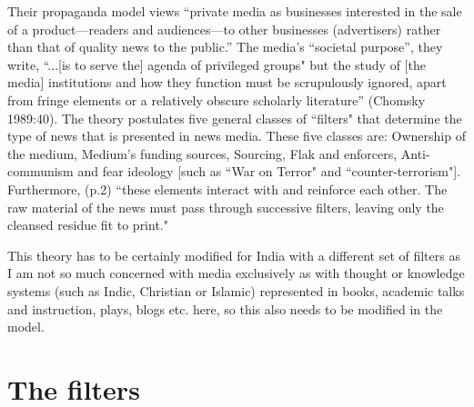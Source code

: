 Their propaganda model views “private media as businesses interested in the sale of a product—readers and audiences—to other businesses (advertisers) rather than that of quality news to the public.” The media's “societal purpose”, they write, “...[is to serve the] agenda of privileged groups" but the study of [the media] institutions and how they function must be scrupulously ignored, apart from fringe elements or a relatively obscure scholarly literature” (Chomsky 1989:40). The theory postulates five general classes of ``filters" that determine the type of news that is presented in news media. These five classes are: Ownership of the medium, Medium’s funding sources, Sourcing, Flak and enforcers, Anti-communism and fear ideology [such as ``War on Terror" and ``counter-terrorism"]. Furthermore, (p.2) ``these elements interact with and reinforce each other. The raw material of the news must pass through successive filters, leaving only the cleansed residue fit to print."
\vskip 2pt

This theory has to be certainly modified for India with a different set of filters as I am not so much concerned with media exclusively as with thought or knowledge systems (such as Indic, Christian or Islamic) represented in books, academic talks and instruction, plays, blogs etc. here, so this also needs to be modified in the model.
\smallskip

\section*{The filters}

